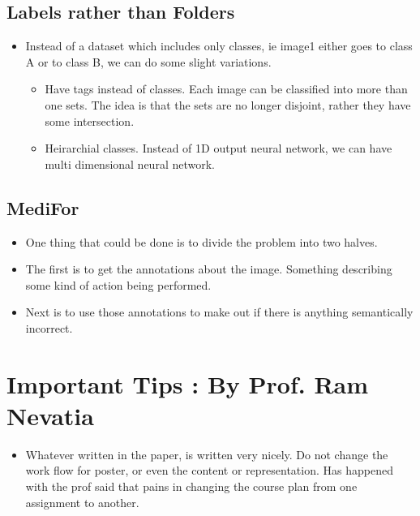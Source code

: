 \documentclass{article}
\begin{document}
\subsection{Labels rather than Folders}
\begin{itemize}
\item Instead of a dataset which includes only classes, ie image1 either goes to class A or to class B, we can do some slight variations.
  \begin{itemize}
  \item Have tags instead of classes. Each image can be classified into more than one sets. The idea is that the sets are no longer disjoint, rather they have some intersection.
  \item Heirarchial classes. Instead of 1D output neural network, we can have multi dimensional neural network.
  \end{itemize}
\end{itemize}
\subsection{MediFor}
\begin{itemize}
\item One thing that could be done is to divide the problem into two halves.
\item The first is to get the annotations about the image. Something describing some kind of action being performed.
\item Next is to use those annotations to make out if there is anything semantically incorrect.
\end{itemize}
\section{Important Tips : By Prof. Ram Nevatia}
\begin{itemize}
\item Whatever written in the paper, is written very nicely. Do not change the work flow for poster, or even the content or representation. Has happened with the prof said that pains in changing the course plan from one assignment to another. 
\end{itemize}
\end{document}
